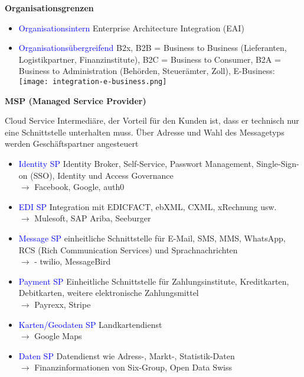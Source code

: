 
\textbf{Organisationsgrenzen}

\begin{itemize}
    \item \textcolor{blue}{Organisationsintern} Enterprise Architecture Integration (EAI)
    \item \textcolor{blue}{Organisationsübergreifend} B2x, B2B = Business to Business (Lieferanten, Logistikpartner, Finanzinstitute), B2C = Business to Consumer, B2A = Business to Administration (Behörden, Steuerämter, Zoll), E-Business: \\
    \texttt{[image: integration-e-business.png]}
\end{itemize}
\vspace{10pt}
\textbf{MSP (Managed Service Provider)}

Cloud Service Intermediäre, der Vorteil für den Kunden ist, dass er technisch nur eine Schnittstelle unterhalten muss. Über Adresse und Wahl des Messagetyps werden Geschäftspartner angesteuert

\begin{itemize}
    \item \textcolor{blue}{Identity SP} Identity Broker, Self-Service, Passwort Management, Single-Sign-on (SSO), Identity und Access Governance \\ $\rightarrow$ Facebook, Google, auth0
    \item \textcolor{blue}{EDI SP} Integration mit EDICFACT, ebXML, CXML, xRechnung usw. \\ $\rightarrow$ Mulesoft, SAP Ariba, Seeburger
    \item \textcolor{blue}{Message SP} einheitliche Schnittstelle für E-Mail, SMS, MMS, WhatsApp, RCS (Rich Communication Services) und Sprachnachrichten \\ $\rightarrow$ - twilio, MessageBird
    \item \textcolor{blue}{Payment SP} Einheitliche Schnittstelle für Zahlungsinstitute, Kreditkarten, Debitkarten, weitere elektronische Zahlungsmittel \\ $\rightarrow$ Payrexx, Stripe
    \item \textcolor{blue}{Karten/Geodaten SP} Landkartendienst \\ $\rightarrow$ Google Maps
    \item \textcolor{blue}{Daten SP} Datendienst wie Adress-, Markt-, Statistik-Daten \\ $\rightarrow$ Finanzinformationen von Six-Group, Open Data Swiss
\end{itemize}
